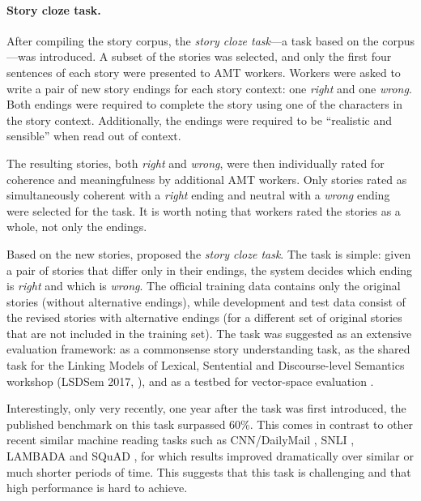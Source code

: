 \documentclass[11pt,a4paper]{article}
\newcommand{\nascomment}[1]{{\color{blue}\textsc{[#1 --nas]}}}
\begin{document}
\paragraph{Story cloze task.}
After compiling the story corpus, the {\it story cloze task}---a task based on the corpus---was introduced.
A subset of the stories was selected, and only the first four sentences of each story were presented to AMT workers.
Workers were asked to write a pair of new story endings for each story context: one {\it right} and one {\it wrong}.
Both endings were required to complete the story using one of the characters in the story context. 
Additionally,  the endings were required to be ``realistic and sensible'' \cite{Mostafazadeh:2016} when read out of context.

The resulting stories, both {\it right} and {\it wrong}, were then individually rated for coherence and meaningfulness by additional AMT workers.
Only stories rated as simultaneously coherent with a {\it right} ending and neutral with a {\it wrong} ending were selected for the task. 
It is worth noting that workers rated the stories as a whole, not only the endings.

Based on the new stories, \citet{Mostafazadeh:2016} proposed the {\it story cloze task}. 
The task is simple:  given a pair of stories that differ only in their endings, the system decides which ending is {\it right} and which is {\it wrong}. 
The official training data contains only the original stories (without alternative endings), while development and test data consist of the revised stories with alternative endings (for a different set of original stories that are not included in the training set).
The task was suggested as an extensive evaluation framework:
as a commonsense story understanding task, 
as the shared task for the  Linking Models of Lexical, Sentential and Discourse-level Semantics workshop (LSDSem 2017, \citealp{LSDSem:2017}), and as a testbed for vector-space evaluation \cite{mostafazadeh2016story}.

Interestingly, only very recently, one year after the task was first introduced, the published benchmark on this task surpassed 60\%.
This comes in contrast to other recent similar machine reading tasks such as CNN/DailyMail \cite{hermann2015teaching}, SNLI \cite{bowman2015large}, LAMBADA \cite{Paperno:2016} and SQuAD \cite{rajpurkar2016squad}, for which results improved dramatically over similar or much shorter periods of time. This suggests that this task is challenging and that high performance is hard to achieve.
\end{document}
